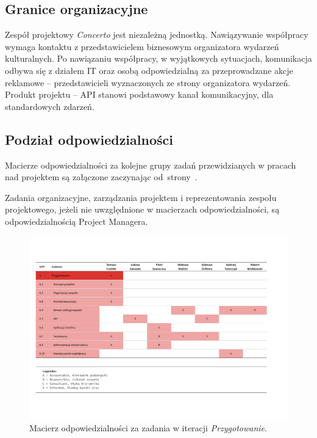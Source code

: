\subsection{Granice organizacyjne}
Zespół projektowy \emph{Concerto} jest niezależną jednostką. Nawiązywanie
współpracy wymaga kontaktu z przedstawicielem biznesowym organizatora wydarzeń
kulturalnych. Po nawiązaniu współpracy, w wyjątkowych sytuacjach, komunikacja
odbywa się z działem IT oraz osobą odpowiedzialną za przeprowadzane akcje
reklamowe -- przedstawicieli wyznaczonych ze strony organizatora wydarzeń.
Produkt projektu -- API stanowi podstawowy kanał komunikacyjny, dla
standardowych zdarzeń.

\subsection{Podział odpowiedzialności}
Macierze odpowiedzialności za kolejne grupy zadań przewidzianych w pracach nad
projektem są załączone zaczynając od~strony~\pageref{fig:organizacja:macierz}.

Zadania organizacyjne, zarządzania projektem i reprezentowania zespołu
projektowego, jeżeli nie uwzględnione w macierzach odpowiedzialności, są
odpowiedzialnością Project Managera.

\begin{figure}[p]
    \includegraphics[angle=270, trim=1cm 1cm 1cm 1cm, width=\textwidth]{./figury/organizacja-projektu/macierz-odpowiedzialnosci-A-przygotowanie}
    \caption{Macierz odpowiedzialności za zadania w iteracji \emph{Przygotowanie}.}
    \label{fig:organizacja:macierz}
\end{figure}

